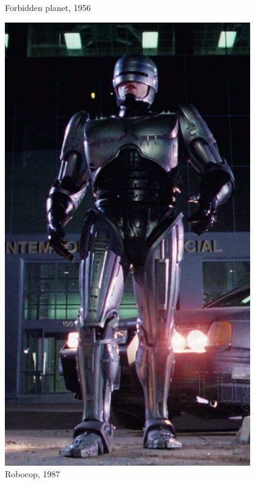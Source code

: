 \documentclass{beamer}
\begin{document}
\begin{frame}
\begin{figure}[h!]
\begin{minipage}[H]{0.20\linewidth}
				\caption{Forbidden planet, 1956}
			\end{minipage}
			\hfill
			\begin{minipage}[H]{0.20\linewidth}
				\includegraphics[width=\linewidth]{presentation_images/2}
				\caption{Robocop, 1987}
			\end{minipage}
			\hfill
			\begin{minipage}[H]{0.20\linewidth}

\end{minipage}
\end{figure}
\end{frame}
\end{document}
